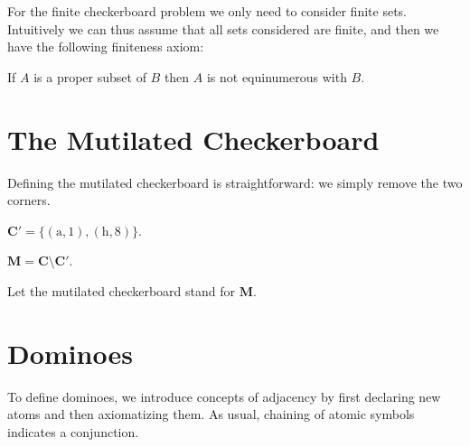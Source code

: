 \documentclass{article}
\newcommand{\fileA}{\mathrm{a}}
\newcommand{\fileH}{\mathrm{h}}
\newcommand{\Checkerboard}{\mathbf{C}}
\newcommand{\Corners}{\mathbf{C'}}
\newcommand{\Mutilated}{\mathbf{M}}
\begin{document}
For the finite checkerboard problem we only need to consider finite sets.
Intuitively we can thus assume that all sets considered are finite, and then
we have the following finiteness axiom:

\begin{forthel}
    \begin{axiom}
        If $A$ is a proper subset of $B$ then $A$ is not equinumerous with $B$.
    \end{axiom}
\end{forthel}


\section{The Mutilated Checkerboard}

Defining the mutilated checkerboard is straightforward:
we simply remove the two corners.

\begin{forthel}
    \begin{definition}
        $\Corners = \{ (\fileA, 1), (\fileH, 8) \}$.
    \end{definition}

    \begin{definition}
        $\Mutilated = \Checkerboard \setminus \Corners$.
    \end{definition}

    Let the mutilated checkerboard stand for $\Mutilated$.
\end{forthel}



\section{Dominoes}

To define dominoes,
we introduce concepts of adjacency by first declaring new atoms and then axiomatizing them.
As usual, chaining of atomic symbols indicates a conjunction.
\end{document}
